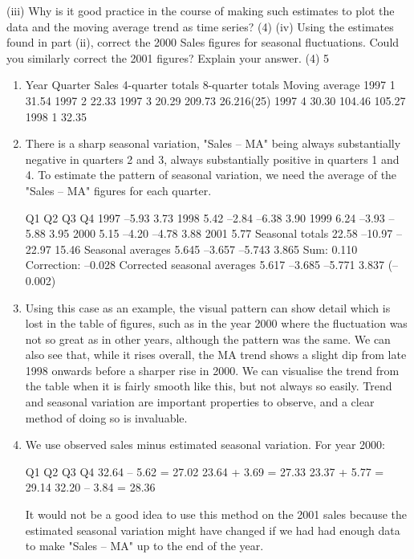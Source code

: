 \documentclass[a4paper,12pt]{article}
\begin{document}
\begin{framed}
(iii) Why is it good practice in the course of making such estimates to plot the data
and the moving average trend as time series?
(4)
(iv) Using the estimates found in part (ii), correct the 2000 Sales figures for
seasonal fluctuations.
Could you similarly correct the 2001 figures? Explain your answer.
(4)
5

\end{framed}
\begin{enumerate}
\item 
Year Quarter Sales 4-quarter totals 8-quarter totals 
Moving average 
1997 1 31.54    1997 2 22.33   1997 3 20.29 209.73 26.216(25) 1997 4 30.30 
 104.46 105.27   1998 1 32.35    
 
 
\item  There is a sharp seasonal variation, "Sales – MA" being always substantially negative in quarters 2 and 3, always substantially positive in quarters 1 and 4.  To estimate the pattern of seasonal variation, we need the average of the "Sales – MA" figures for each quarter. 
 
 Q1 Q2 Q3 Q4   1997     –5.93   3.73   1998   5.42   –2.84   –6.38   3.90   1999   6.24   –3.93   –5.88   3.95   2000   5.15   –4.20   –4.78   3.88   2001   5.77      Seasonal totals 22.58 –10.97 –22.97 15.46   Seasonal averages     5.645     –3.657     –5.743     3.865 Sum:  0.110 Correction:  –0.028 Corrected seasonal averages     5.617     –3.685     –5.771     3.837 (–0.002)  
 
 
\item Using this case as an example, the visual pattern can show detail which is lost in the table of figures, such as in the year 2000 where the fluctuation was not so great as in other years, although the pattern was the same.  We can also see that, while it rises overall, the MA trend shows a slight dip from late 1998 onwards before a sharper rise in 2000.  We can visualise the trend from the table when it is fairly smooth like this, but not always so easily.  Trend and seasonal variation are important properties to observe, and a clear method of doing so is invaluable. 
 
\item We use observed sales minus estimated seasonal variation.  For year 2000: 
 
Q1 Q2 Q3 Q4 32.64 – 5.62 = 27.02 23.64 + 3.69 = 27.33 23.37 + 5.77 = 29.14 32.20 – 3.84 = 28.36 
 
It would not be a good idea to use this method on the 2001 sales because the estimated seasonal variation might have changed if we had had enough data to make "Sales – MA" up to the end of the year. 
\end{enumerate}
\end{document}
